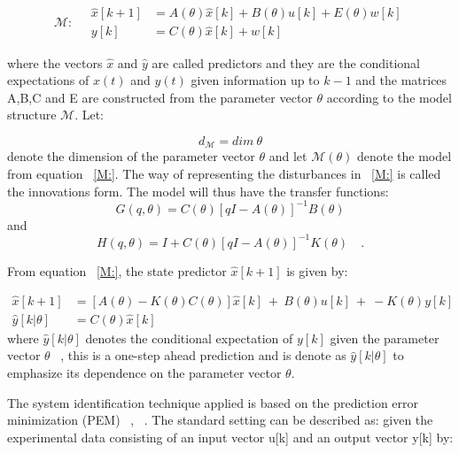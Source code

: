\begin{equation}
\mathcal{M}:\quad
\begin{aligned}
\hat{x}[k+1]&= A(\theta)\hat{x}[k] + B(\theta)u[k] + E(\theta)w[k] \\
y[k]&=C(\theta)\hat{x}[k]+w[k]
\end{aligned}
\label{M:}
\end{equation}

where  the vectors $\hat{x}$ and $\hat{y}$ are called predictors and they are the conditional expectations of $x(t)$ and $y(t)$ given information up to $k-1$ and the matrices A,B,C and E are constructed from the parameter vector $\theta$ according to the model structure $\mathcal{M}$. Let:

\begin{equation}
d_{\mathcal{M}}=dim ~\theta
\end{equation}
 denote the dimension of the parameter vector $\theta$ and let $\mathcal{M}(\theta)$ denote the model from equation ~\ref{M:}. The way of representing the disturbances in ~\ref{M:} is called the innovations form. The model will thus have the transfer functions:
 \begin{equation}
 G(q,\theta)=C(\theta)[qI-A(\theta)]^{-1}B(\theta)
 \end{equation}
 and
 \begin{equation}
 H(q,\theta)=I+C(\theta)[qI-A(\theta)]^{-1}K(\theta) \quad .
 \end{equation}

From equation ~\ref{M:}, the state predictor $\hat{x}[k+1]$ is given by:

\begin{equation}
\label{predictor}
\begin{aligned}
\hat{x}[k+1]&=[A(\theta)-K(\theta)C(\theta)]\hat{x}[k]~+~B(\theta)u[k]~+~-K(\theta)y[k] \\
\hat{y}[k|\theta]&=C(\theta)\hat{x}[k]
\end{aligned}
\end{equation}
 where  $\hat{y}[k|\theta]$ denotes the conditional expectation of $y[k]$ given the parameter vector $\theta$ ~\cite[Chapter~3]{Ljung1987}, this is a one-step ahead prediction and is denote as $\hat{y}[k|\theta]$ to emphasize its dependence on the parameter vector $\theta$.\smallskip
 
The system identification technique  applied is based on the prediction error minimization (PEM) ~\cite[Chapter~7]{Ljung1987}, ~\cite[Chapter~3]{Ljung1987}. The standard setting can be described as: given the experimental data consisting of an input vector {u[k]} and an output vector {y[k] } by:


